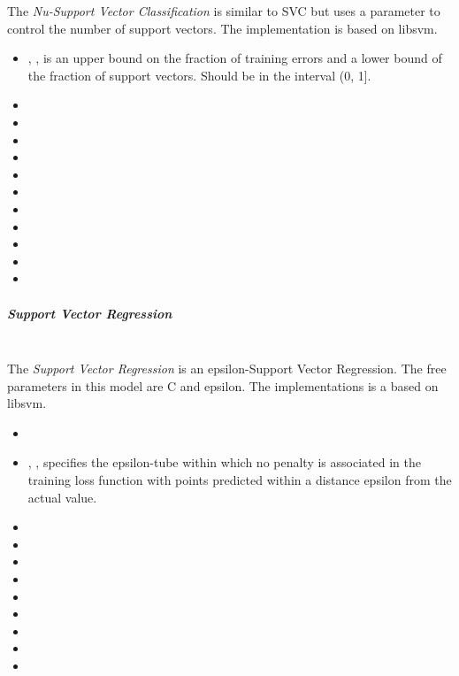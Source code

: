 The \textit{Nu-Support Vector Classification} is similar to SVC but uses a
parameter to control the number of support vectors.
%
The implementation is based on libsvm.
%
\begin{itemize}
  \item {}, , is an upper bound on the
  fraction of training errors and a lower bound of the fraction of support
  vectors.
  Should be in the interval (0, 1].
  \item {}
  \item {}
  \item {}
  \item {}
  \item {}
  \item {}
  \item {}
  \item \cacheSizeDescription{}
  \item {}
  \item {}
  \item {}
\end{itemize}

\subparagraph{Support Vector Regression}
\mbox{}
\\The \textit{Support Vector Regression} is an epsilon-Support Vector
Regression.
%
The free parameters in this model are C and epsilon.
%
The implementations is a based on libsvm.
%
\begin{itemize}
  \item {}
  \item {}, , specifies the
  epsilon-tube within which no penalty is associated in the training loss
  function with points predicted within a distance epsilon from the actual
  value.
  \item {}
  \item {}
  \item {}
  \item {}
  \item {}
  \item {}
  \item \cacheSizeDescription{}
  \item {}
  \item {}
\end{itemize}
